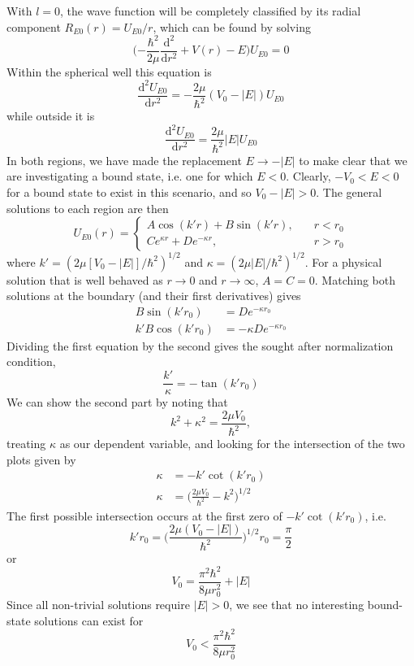 \documentclass[../principles-of-quantum-mechanics.tex]{subfiles}
\begin{document}
\begin{questions}
		\begin{solution}
			With $l = 0$, the wave function will be completely classified by its radial component $R_{E0}(r) = U_{E0}/r$, which can be found by solving
			$$\Big({-\frac{\hbar^2}{2\mu}}\frac{\mathrm{d}^2}{\mathrm{d}r^2} + V(r) - E\Big)U_{E0} = 0$$
			Within the spherical well this equation is
			$$\frac{\mathrm{d}^2U_{E0}}{\mathrm{d}r^2} = -\frac{2\mu}{\hbar^2}(V_0 - |E|)U_{E0}$$
			while outside it is
			$$\frac{\mathrm{d}^2U_{E0}}{\mathrm{d}r^2} = \frac{2\mu}{\hbar^2}|E|U_{E0}$$
			In both regions, we have made the replacement $E \to -|E|$ to make clear that we are investigating a bound state, i.e. one for which $E<0$. Clearly, $-V_0 < E < 0$ for a bound state to exist in this scenario, and so $V_0 - |E|> 0$. The general solutions to each region are then
			$$U_{E0}(r) = \begin{cases}
				A\cos(k'r) + B\sin(k'r), \quad &r< r_0 \\
				Ce^{\kappa r} + De^{-\kappa r}, &r > r_0
			\end{cases}$$
			where $k' = (2\mu[V_0-|E|]/\hbar^2)^{1/2}$ and $\kappa = (2\mu|E|/\hbar^2)^{1/2}$. For a physical solution that is well behaved as $r \to 0$ and $r\to\infty$, $A = C = 0$. Matching both solutions at the boundary (and their first derivatives) gives
			\begin{align*}
				B\sin(k'r_0) &= De^{-\kappa r_0} \\
				k'B\cos(k'r_0) &= -\kappa De^{-\kappa r_0}
			\end{align*}
			Dividing the first equation by the second gives the sought after normalization condition,
			$$\frac{k'}{\kappa} = {-\tan(k'r_0)}$$
			We can show the second part by noting that
			$$k^2 + \kappa^2 = \frac{2\mu V_0}{\hbar^2},$$
			treating $\kappa$ as our dependent variable, and looking for the intersection of the two plots given by
			\begin{align*}
				\kappa &= -k'\cot(k'r_0) \\
				\kappa &= \Big(\frac{2\mu V_0}{\hbar^2} - k^2\Big)^{1/2}
			\end{align*}
			The first possible intersection occurs at the first zero of $-k'\cot(k'r_0)$, i.e.
			$$k'r_0 = \Big(\frac{2\mu(V_0 - |E|)}{\hbar^2}\Big)^{1/2}r_0 = \frac{\pi}{2}$$
			or
			$$V_0 = \frac{\pi^2\hbar^2}{8\mu r_0^2} + |E|$$
			Since all non-trivial solutions require $|E| > 0$, we see that no interesting bound-state solutions can exist for
			$$V_0 < \frac{\pi^2\hbar^2}{8\mu r_0^2}$$
		\end{solution}
	

\end{questions}
\end{document}
